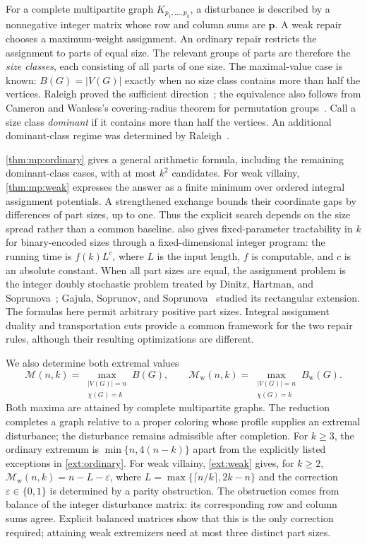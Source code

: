 \documentclass[11pt,reqno]{amsart}
\numberwithin{equation}{section}
\theoremstyle{definition}
\theoremstyle{remark}
\begin{document}
For a complete multipartite graph $K_{p_1,\ldots,p_k}$, a disturbance
is described by a nonnegative integer matrix whose row and column
sums are $\mathbf p$. A weak repair chooses a maximum-weight
assignment. An ordinary repair restricts the assignment to parts of
equal size. The relevant groups of parts are therefore the
\emph{size classes}, each consisting of all parts of one size.
The maximal-value case is known: $B(G)=|V(G)|$ exactly when no size
class contains more than half the vertices. Raleigh proved the
sufficient direction~\cite[Theorem~1]{raleigh2018}; the equivalence
also follows from Cameron and Wanless's covering-radius theorem for
permutation groups~\cite[Theorem~14]{cameronwanless2005}.
Call a size class \emph{dominant} if it contains more than half the
vertices. An additional dominant-class regime was determined by
Raleigh~\cite[Theorem~4]{raleigh2018}.

\cref{thm:mp:ordinary} gives a general arithmetic formula,
including the remaining dominant-class cases, with at most $k^2$
candidates. For weak villainy, \cref{thm:mp:weak} expresses
the answer as a finite minimum over ordered integral assignment
potentials. A strengthened exchange bounds their coordinate gaps
by differences of part sizes, up to one. Thus the explicit search
depends on the size spread rather than a common baseline.
 also gives fixed-parameter tractability
in $k$ for binary-encoded sizes through a fixed-dimensional integer
program: the running time is $f(k)L^c$, where $L$ is the input length,
$f$ is computable, and $c$ is an absolute constant.
When all part sizes are equal, the assignment problem
is the integer doubly stochastic problem treated by Dinitz, Hartman,
and Soprunova~\cite{dinitz2012}; Gajula, Soprunov, and
Soprunova~\cite{gajula2015} studied its rectangular extension.
The formulas here permit arbitrary positive part sizes. Integral
assignment duality and transportation cuts provide a common framework
for the two repair rules, although their resulting optimizations
are different.

We also determine both extremal values
\[
 \mathcal M(n,k)=\max_{\substack{|V(G)|=n\\\chi(G)=k}}B(G),
 \qquad
 \mathcal M_{\mathrm w}(n,k)
 =\max_{\substack{|V(G)|=n\\\chi(G)=k}}B_{\mathrm w}(G).
\]
Both maxima are attained by complete multipartite graphs. The reduction
completes a graph relative to a proper coloring whose profile supplies
an extremal disturbance; the disturbance remains admissible after
completion. For $k\ge3$, the ordinary extremum is
$\min\{n,4(n-k)\}$ apart from the explicitly listed exceptions in
\cref{ext:ordinary}. For weak villainy,
\cref{ext:weak} gives, for $k\ge2$,
$\mathcal M_{\mathrm w}(n,k)=n-L-\varepsilon$, where
$L=\max\{\lceil n/k\rceil,2k-n\}$ and the correction
$\varepsilon\in\{0,1\}$ is determined by a parity obstruction.
The obstruction comes from balance of the integer disturbance matrix:
its corresponding row and column sums agree. Explicit balanced
matrices show that this is the only correction required; attaining
weak extremizers need at most three distinct part sizes.
\end{document}
